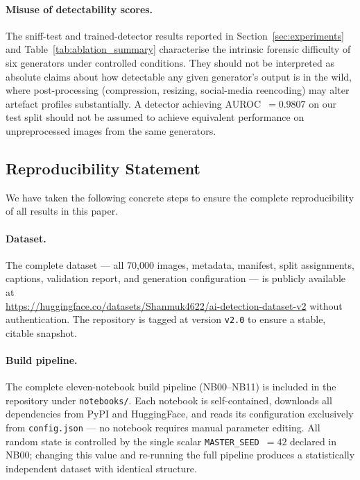 \paragraph{Misuse of detectability scores.}
The sniff-test and trained-detector results reported in
Section~\ref{sec:experiments} and Table~\ref{tab:ablation_summary} characterise the intrinsic forensic
difficulty of six generators under controlled conditions.
They should not be interpreted as absolute claims about how detectable
any given generator's output is in the wild, where post-processing
(compression, resizing, social-media reencoding) may alter artefact
profiles substantially.
A detector achieving AUROC~$= 0.9807$ on our test split should not be
assumed to achieve equivalent performance on unpreprocessed images
from the same generators.

\subsection{Reproducibility Statement}
\label{ssec:reproducibility}

We have taken the following concrete steps to ensure the complete
reproducibility of all results in this paper.

\paragraph{Dataset.}
The complete dataset — all 70,000 images, metadata, manifest, split
assignments, captions, validation report, and generation configuration
— is publicly available at\\
\url{https://huggingface.co/datasets/Shanmuk4622/ai-detection-dataset-v2}
without authentication.
The repository is tagged at version \texttt{v2.0} to ensure a stable,
citable snapshot.

\paragraph{Build pipeline.}
The complete eleven-notebook build pipeline (NB00--NB11) is included
in the repository under \texttt{notebooks/}.
Each notebook is self-contained, downloads all dependencies from
PyPI and HuggingFace, and reads its configuration exclusively from
\texttt{config.json} — no notebook requires manual parameter editing.
All random state is controlled by the single scalar \texttt{MASTER\_SEED}~$= 42$
declared in NB00; changing this value and re-running the full pipeline
produces a statistically independent dataset with identical structure.

